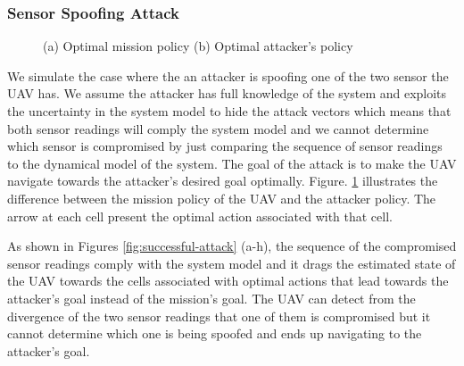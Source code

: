 \documentclass[letterpaper, 10 pt, conference]{ieeeconf}  %
\begin{document}
\subsubsection{Sensor Spoofing Attack}
\begin{figure}[]
	\centering
	\caption{(a) Optimal mission policy (b) Optimal attacker's policy}
	\label{fig:policies}
\end{figure}
We simulate the case where the an attacker is spoofing one of the two sensor the UAV has. We assume the attacker has full knowledge of the system and exploits the uncertainty in the system model to hide the attack vectors which means that both sensor readings will comply the system model and we cannot determine which sensor is compromised by just comparing the sequence of sensor readings to the dynamical model of the system. The goal of the attack is to make the UAV navigate towards the attacker's desired goal optimally. Figure. \ref{fig:policies} illustrates the difference between the mission policy of the UAV and the attacker policy. The arrow at each cell present the optimal action associated with that cell.

As shown in Figures \ref{fig:successful-attack} (a-h), the sequence of the compromised sensor readings comply with the system model and it drags the estimated state of the UAV towards the cells associated with optimal actions that lead towards the attacker's goal instead of the mission's goal. The UAV can detect from the divergence of the two sensor readings that one of them is compromised but it cannot determine which one is being spoofed and ends up navigating to the attacker's goal.
\end{document}
